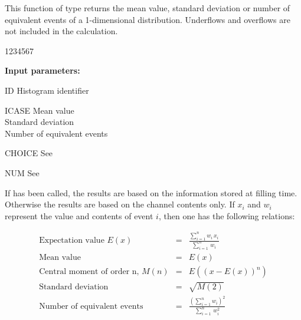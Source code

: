  
\Action
{}
This function of type  returns the mean value, standard deviation
or number of equivalent events of a 1-dimensional distribution.
Underflows and overflows are not included in the calculation.
 
\begin{DLtt}{1234567}
\item[{\rm\bf Input parameters:}]
\item[ID] Histogram identifier
\item[ICASE]  Mean value\\
              Standard deviation\\
              Number of equivalent events
\item[CHOICE] See 
\item[NUM] See 
\end{DLtt}
If 
has been called, the results are based on the
information stored at filling time.
Otherwise the results are based on the channel contents only.
If $x_i$ and $w_i$ represent the value and contents of event $i$, then
one has the following relations:

\bigskip

\begin{eqnarray*}
\mbox{Expectation value } E(x)          & = &
  \frac{\textstyle\sum_{i=1}^{n}w_i\, x_i}{\textstyle\sum_{i=1}^{n}\, w_i} \\
\mbox{Mean value}                       & = & E(x)                         \\
\mbox{Central moment of order n, } M(n) & = & E (( x - E(x))^n)            \\
\mbox{Standard deviation}               & = & \sqrt{M(2)}                  \\
\mbox{Number of equivalent events}      & = &
  \frac{\textstyle\left({\sum_{i=1}^n}{w_i}\right)^2}%
       {\textstyle\sum_{i=1}^n\, w_i^2}
\end{eqnarray*}

